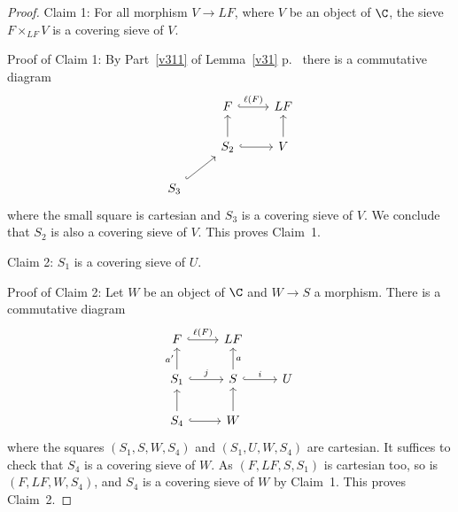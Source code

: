 \documentclass[12pt]{article}
\theoremstyle{remark}
\theoremstyle{definition}
\begin{document}
\begin{proof}
\nn Claim 1: For all morphism $V\to LF$, where $V$ be an object of $\C$, the sieve $F\times_{LF}V$ is a covering sieve of $V$.

\nn Proof of Claim 1: %
By Part~\ref{v311} of Lemma~\ref{v31} p.~\pageref{v31} there is a commutative diagram 
$$
\begin{tikzcd}
&F\ar[r,hookrightarrow,"\ell(F)"]&LF\\ 
&S_2\ar[u]\ar[r,hookrightarrow]&V\ar[u]\\ 
S_3\ar[ur,hookrightarrow]
\end{tikzcd}
$$ 
where the small square is cartesian and $S_3$ is a covering sieve of $V$. We conclude that $S_2$ is also a covering sieve of $V$. This proves Claim~1. 

\nn Claim 2: $S_1$ is a covering sieve of $U$.

\nn Proof of Claim 2: Let $W$ be an object of $\C$ and $W\to S$ a morphism. There is a commutative diagram 
$$
\begin{tikzcd}
F\ar[r,hookrightarrow,"\ell(F)"]&LF\\ 
S_1\ar[u,"a'"]\ar[r,hookrightarrow,"j"]&S\ar[u,"a"']\ar[r,hookrightarrow,"i"]&U\\ 
S_4\ar[u]\ar[r,hookrightarrow]&W\ar[u]
\end{tikzcd}
$$ 
where the squares $(S_1,S,W,S_4)$ and $(S_1,U,W,S_4)$ are cartesian. It suffices to check that $S_4$ is a covering sieve of $W$. As $(F,LF,S,S_1)$ is cartesian too, so is $(F,LF,W,S_4)$, and $S_4$ is a covering sieve of $W$ by Claim~1. This proves Claim~2.


\end{proof}
\end{document}

